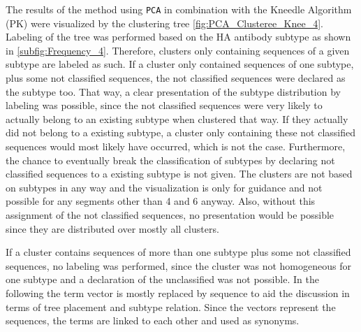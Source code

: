 \vspace{1em}

The results of the method using \texttt{PCA} in combination with the Kneedle Algorithm (PK) were visualized by the clustering tree \autoref{fig:PCA_Clusteree_Knee_4}. Labeling of the tree was performed based on the \gls{HA} antibody subtype as shown in \autoref{subfig:Frequency_4}. Therefore, clusters only containing sequences of a given subtype are labeled as such. If a cluster only contained sequences of one subtype, plus some not classified sequences, the not classified sequences were declared as the subtype too. That way, a clear presentation of the subtype distribution by labeling was possible, since the not classified sequences were very likely to actually belong to an existing subtype when clustered that way. If they actually did not belong to a existing subtype, a cluster only containing these not classified sequences would most likely have occurred, which is not the case. Furthermore, the chance to eventually break the classification of subtypes by declaring not classified sequences to a existing subtype is not given. The clusters are not based on subtypes in any way and the visualization is only for guidance and not possible for any segments other than 4 and 6 anyway. Also, without this assignment of the not classified sequences, no presentation would be possible since they are distributed over mostly all clusters.

\vspace{1em}

If a cluster contains sequences of more than one subtype plus some not classified sequences, no labeling was performed, since the cluster was not homogeneous for one subtype and a declaration of the unclassified was not possible. In the following the term vector is mostly replaced by sequence to aid the discussion in terms of tree placement and subtype relation. Since the vectors represent the sequences, the terms are linked to each other and used as synonyms. %

